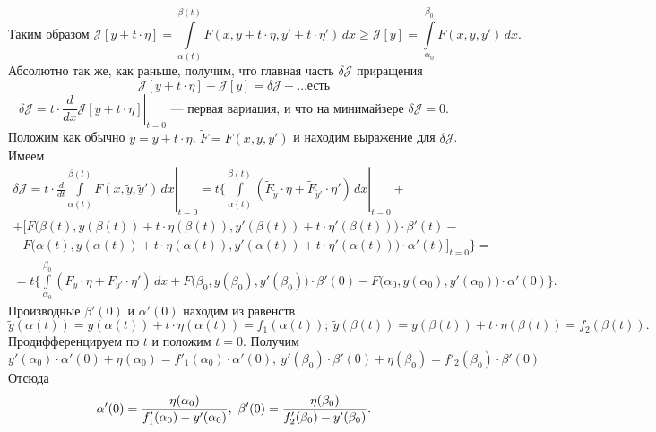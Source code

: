 \documentclass[12pt,a4paper,openany,fleqn]{book}
\newcommand{\J}{\ensuremath{\mathcal{J}}}
\newcommand{\der}[2]{\ensuremath{\frac{d#1}{d#2}}}
\theoremstyle{definition}
\begin{document}
\begin{equation*}
	\text{Таким образом }\J[y+t\cdot\eta]=\int\limits_{\alpha(t)}^{\beta(t)} F(x,y+t\cdot\eta,y'+t\cdot\eta')\,dx\geqslant\J[y]=\int\limits_{\alpha_0}^{\beta_0}F(x,y,y')\,dx.
\end{equation*}
Абсолютно так же, как раньше, получим, что главная часть $\delta\J$ приращения \begin{equation*}
	\J[y+t\cdot\eta]-\J[y]=\delta\J+\ldots\text{есть}
\end{equation*}  
\begin{equation*}
	\delta\J=t\cdot\left.\der{}{x}\J[y+t\cdot\eta]\right|_{t=0}\text{ --- первая вариация, и что на минимайзере }\delta\J=0.
\end{equation*}
Положим как обычно $\tilde{y}=y+t\cdot\eta$, $\widetilde{F}=F(x,\tilde{y},\tilde{y}')$ и находим выражение для $\delta\J$. Имеем 
\begin{multline}
	\label{l3:eq:20}
	\delta\J=t\cdot\left.\der{}{t}\int\limits_{\alpha(t)}^{\beta(t)}F(x,\tilde{y},\tilde{y}')\,dx\right|_{t=0}=t\Bigg\{\left.\int\limits_{\alpha(t)}^{\beta(t)}\left(\widetilde{F}_{\tilde{y}}\cdot\eta+\widetilde{F}_{\tilde{y}'}\cdot\eta'\right)\,dx\right|_{t=0}+\\+
	\Big[F\big(\beta(t),y(\beta(t))+t\cdot\eta(\beta(t)),y'(\beta(t))+t\cdot\eta'(\beta(t))\big)\cdot\beta'(t)-\\-F\big(\alpha(t),y(\alpha(t))+t\cdot\eta(\alpha(t)),y'(\alpha(t))+t\cdot\eta'(\alpha(t))\big)\cdot\alpha'(t)\Big]_{t=0}\Bigg\}=\\
	=t\Bigg\{\int\limits_{\alpha_0}^{\beta_0}\left(F_{y}\cdot\eta+F_{y'}\cdot\eta'\right)\,dx+F\big(\beta_0,y(\beta_0),y'(\beta_0)\big)\cdot\beta'(0)-F\big(\alpha_0,y(\alpha_0),y'(\alpha_0)\big)\cdot\alpha'(0)\Bigg\}.
\end{multline}
Производные $\beta'(0)$ и $\alpha'(0)$ находим из равенств
\begin{equation*}
	\tilde{y}(\alpha(t))=y(\alpha(t))+t\cdot\eta(\alpha(t))=f_1(\alpha(t));\ \tilde{y}(\beta(t))=y(\beta(t))+t\cdot\eta(\beta(t))=f_2(\beta(t)).
\end{equation*}
Продифференцируем по $t$ и положим $t=0$. Получим
\begin{equation*}
	y'(\alpha_0)\cdot\alpha'(0)+\eta(\alpha_0)=f'_1(\alpha_0)\cdot\alpha'(0),\ y'(\beta_0)\cdot\beta'(0)+\eta(\beta_0)=f'_2(\beta_0)\cdot\beta'(0)
\end{equation*}
Отсюда 
\begin{equation}
	\label{l3:eq:21}
	\hfill\alpha'(0)=\frac{\eta(\alpha_0)}{f'_1(\alpha_0)-y'(\alpha_0)},\ \beta'(0)=\frac{\eta(\beta_0)}{f'_2(\beta_0)-y'(\beta_0)}.\hfill
\end{equation}
\end{document}
